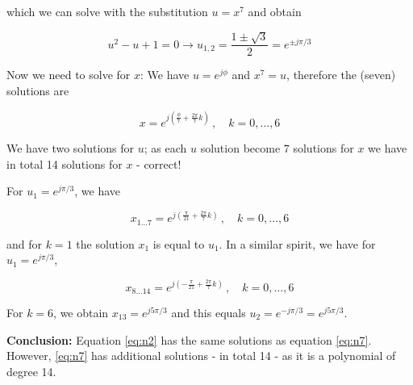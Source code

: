 which we can solve with the substitution \(u=x^7\) and obtain

\[
u^2 - u + 1 = 0 \rightarrow u_{1,2} = \frac{1 \pm \sqrt{3}}{2} = e^{\pm j\pi/3}
\]

Now we need to solve for \(x\): We have \(u=e^{j\phi}\) and \(x^7 = u\),
therefore the (seven) solutions are

\[
x=e^{j\left( \frac{\phi}{7} + \frac{2\pi}{7}k\right)}\, ,\quad k=0,\ldots,6
\]

We have two solutions for \(u\); as each \(u\) solution become \(7\)
solutions for \(x\) we have in total 14 solutions for \(x\) - correct!

For \(u_1 = e^{j\pi/3}\), we have

\[
x_{1 \ldots 7} = e^{j\left( \frac{\pi}{21} + \frac{2\pi}{7}k\right)}\, ,\quad k=0,\ldots,6
\]

and for \(k=1\) the solution \(x_1\) is equal to \(u_1\). In a similar
spirit, we have for \(u_1 = e^{j\pi/3}\),

\[
x_{8 \ldots 14} = e^{j\left( -\frac{\pi}{21} + \frac{2\pi}{7}k\right)}\, ,\quad k=0,\ldots,6
\]

For \(k=6\), we obtain \(x_{13} = e^{j5\pi / 3}\) and this equals
\(u_2=e^{-j\pi/3} = e^{j5\pi / 3}\).

\textbf{Conclusion:} Equation \eqref{eq:n2} has the same solutions as
equation \eqref{eq:n7}. However, \eqref{eq:n7} has additional solutions
- in total 14 - as it is a polynomial of degree 14.
